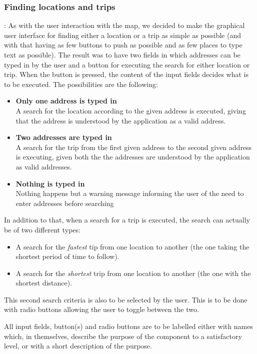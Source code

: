 \subsubsection{Finding locations and trips}:
As with the user interaction with the map, we decided to make the graphical user interface for finding either a location or a trip as simple as possible (and with that having as few buttons to push as possible and as few places to type text as possible). The result was to have two fields in which addresses can be typed in by the user and a button for executing the search for either location or trip. When the button is pressed, the content of the input fields decides what is to be executed. The possibilities are the following:
\begin{itemize}
	\item \textbf{Only one address is typed in} \\
		A search for the location according to the given address is executed, giving that the address is understood by the application as a valid address.
	\item \textbf{Two addresses are typed in} \\
		A search for the trip from the first given address to the second given address is executing, given both the the addresses are understood by the application as valid addresses.
	\item \textbf{Nothing is typed in} \\
		Nothing happens but a warning message informing the user of the need to enter addresses before searching
\end{itemize}
In addition to that, when a search for a trip is executed, the search can actually be of two different types:
\begin{itemize}
	\item A search for the \textit{fastest} tip from one location to another (the one taking the shortest period of time to follow).
	\item A search for the \textit{shortest} trip from one location to another (the one with the shortest distance).
\end{itemize}
This second search criteria is also to be selected by the user. This is to be done with radio buttons allowing the user to toggle between the two.

All input fields, button(s) and radio buttons are to be labelled either with names which, in themselves, describe the purpose of the component to a satisfactory level, or with a short description of the purpose.

